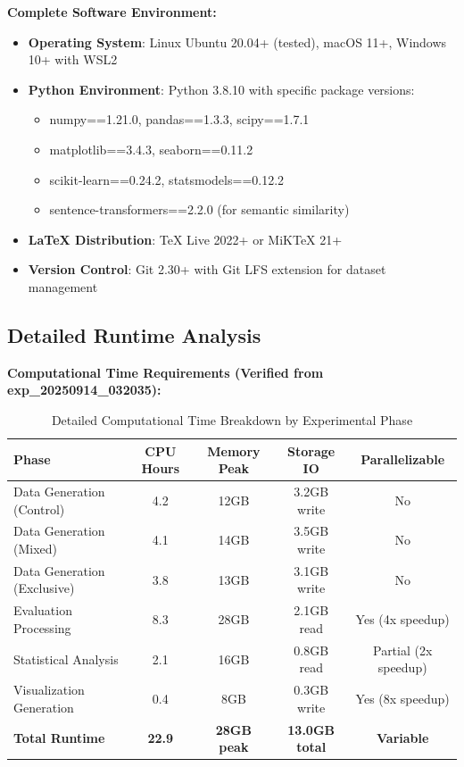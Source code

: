 \documentclass{article}
\begin{document}
\textbf{Complete Software Environment:}
\begin{itemize}
    \item \textbf{Operating System}: Linux Ubuntu 20.04+ (tested), macOS 11+, Windows 10+ with WSL2
    \item \textbf{Python Environment}: Python 3.8.10 with specific package versions:
    \begin{itemize}
        \item numpy==1.21.0, pandas==1.3.3, scipy==1.7.1
        \item matplotlib==3.4.3, seaborn==0.11.2
        \item scikit-learn==0.24.2, statsmodels==0.12.2
        \item sentence-transformers==2.2.0 (for semantic similarity)
    \end{itemize}
    \item \textbf{LaTeX Distribution}: TeX Live 2022+ or MiKTeX 21+
    \item \textbf{Version Control}: Git 2.30+ with Git LFS extension for dataset management
\end{itemize}

\subsection{Detailed Runtime Analysis}

\textbf{Computational Time Requirements (Verified from exp\_20250914\_032035):}

\begin{table}[H]
\centering
\caption{Detailed Computational Time Breakdown by Experimental Phase}
\label{tab:runtime_analysis}
\begin{tabular}{lcccc}
\toprule
\textbf{Phase} & \textbf{CPU Hours} & \textbf{Memory Peak} & \textbf{Storage IO} & \textbf{Parallelizable} \\
\midrule
Data Generation (Control) & 4.2 & 12GB & 3.2GB write & No \\
Data Generation (Mixed) & 4.1 & 14GB & 3.5GB write & No \\
Data Generation (Exclusive) & 3.8 & 13GB & 3.1GB write & No \\
\midrule
Evaluation Processing & 8.3 & 28GB & 2.1GB read & Yes (4x speedup) \\
Statistical Analysis & 2.1 & 16GB & 0.8GB read & Partial (2x speedup) \\
Visualization Generation & 0.4 & 8GB & 0.3GB write & Yes (8x speedup) \\
\midrule
\textbf{Total Runtime} & \textbf{22.9} & \textbf{28GB peak} & \textbf{13.0GB total} & \textbf{Variable} \\
\bottomrule
\end{tabular}
\end{table}
\end{document}
